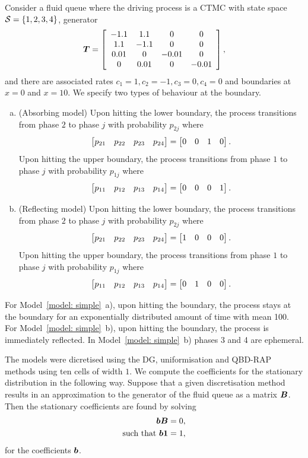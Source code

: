 \begin{model}\label{model: simple}
	Consider a fluid queue where the driving process is a CTMC with state space \(\mathcal{S}=\{1,2,3,4\}\), generator 
	\[\boldsymbol T = \left[\begin{array}{cccc}
		-1.1 & 1.1 & 0 & 0 \\
		1.1 & -1.1 & 0 & 0 \\ 
		0.01 & 0 & -0.01 & 0 \\
		0 & 0.01 & 0 & -0.01 
	\end{array}\right],\]
	and there are associated rates \(c_1=1, c_2 = -1, c_3=0, c_4=0\) and boundaries at \(x=0\) and \(x=10\). We specify two types of behaviour at the boundary.
	\begin{enumerate}[a)]
		\item (Absorbing model) Upon hitting the lower boundary, the process transitions from phase \(2\) to phase \(j\) with probability \(p_{2j}\) where 
		\[\begin{bmatrix} p_{21} & p_{22} & p_{23} & p_{24} \end{bmatrix} = \begin{bmatrix} 0 & 0 & 1 & 0 \end{bmatrix}.\]
		Upon hitting the upper boundary, the process transitions from phase \(1\) to phase \(j\) with probability \(p_{1j}\) where 
		\[\begin{bmatrix} p_{11} & p_{12} & p_{13} & p_{14} \end{bmatrix} = \begin{bmatrix} 0 & 0 & 0 & 1 \end{bmatrix}.\]
		\item (Reflecting model) Upon hitting the lower boundary, the process transitions from phase \(2\) to phase \(j\) with probability \(p_{2j}\) where 
		\[\begin{bmatrix} p_{21} & p_{22} & p_{23} & p_{24} \end{bmatrix} = \begin{bmatrix} 1 & 0 & 0 & 0 \end{bmatrix}.\]
		Upon hitting the upper boundary, the process transitions from phase \(1\) to phase \(j\) with probability \(p_{1j}\) where 
		\[\begin{bmatrix} p_{11} & p_{12} & p_{13} & p_{14} \end{bmatrix} = \begin{bmatrix} 0 & 1 & 0 & 0 \end{bmatrix}.\]
	\end{enumerate}
\end{model}
For Model~\ref{model: simple}~a), upon hitting the boundary, the process stays at the boundary for an exponentially distributed amount of time with mean 100. For Model~\ref{model: simple}~b), upon hitting the boundary, the process is immediately reflected. In Model~\ref{model: simple}~b) phases 3 and 4 are ephemeral. 

The models were dicretised using the DG, uniformisation and QBD-RAP methods using ten cells of width \(1\). We compute the coefficients for the stationary distribution in the following way. Suppose that a given discretisation method results in an approximation to the generator of the fluid queue as a matrix \(\boldsymbol B\). Then the stationary coefficients are found by solving 
\begin{align}
	\boldsymbol b \boldsymbol B = 0,\\
	\mbox{such that } \boldsymbol b\boldsymbol 1=1,
\end{align}
for the coefficients \(\boldsymbol b\). 

